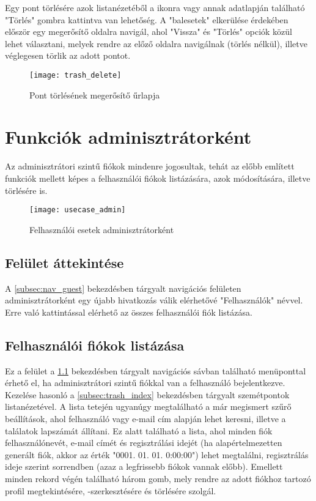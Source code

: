 Egy pont törlésére azok listanézetéből a  ikonra vagy annak adatlapján található "Törlés" gombra kattintva van lehetőség. A "balesetek" elkerülése érdekében először egy megerősítő oldalra navigál, ahol "Vissza" és "Törlés" opciók közül lehet választani, melyek rendre az előző oldalra navigálnak (törlés nélkül), illetve véglegesen törlik az adott pontot.

\begin{figure}[H]
	\centering
	\texttt{[image: trash\_delete]}
	\caption{Pont törlésének megerősítő űrlapja}
	\label{fig:trash_delete}
\end{figure}

\section{Funkciók adminisztrátorként}

Az adminisztrátori szintű fiókok mindenre jogosultak, tehát az előbb említett funkciók mellett képes a felhasználói fiókok listázására, azok módosítására, illetve törlésére is.

\begin{figure}[H]
	\centering
	\texttt{[image: usecase\_admin]}
	\caption{Felhasználói esetek adminisztrátorként}
	\label{fig:usecase_admin}
\end{figure}

\subsection{Felület áttekintése}
\label{subsec:nav_admin}

A \ref{subsec:nav_guest} bekezdésben tárgyalt navigációs felületen adminisztrátorként egy újabb hivatkozás válik elérhetővé "Felhasználók" névvel. Erre való kattintással elérhető az összes felhasználói fiók listázása.

\subsection{Felhasználói fiókok listázása}

Ez a felület a \ref{subsec:nav_admin} bekezdésben tárgyalt navigációs sávban található menüponttal érhető el, ha adminisztrátori szintű fiókkal van a felhasználó bejelentkezve. Kezelése hasonló a \ref{subsec:trash_index} bekezdésben tárgyalt szemétpontok listanézetével. A lista tetején ugyanúgy megtalálható a már megismert szűrő beállítások, ahol felhasználó vagy e-mail cím alapján lehet keresni, illetve a találatok lapszámát állítani. Ez alatt található a lista, ahol minden fiók felhasználónevét, e-mail címét és regisztrálási idejét (ha alapértelmezetten generált fiók, akkor az érték "0001. 01. 01. 0:00:00") lehet megtalálni, regisztrálás ideje szerint sorrendben (azaz a legfrissebb fiókok vannak előbb). Emellett minden rekord végén található három gomb, mely rendre az adott fiókhoz tartozó profil megtekintésére, -szerkesztésére és törlésére szolgál.

